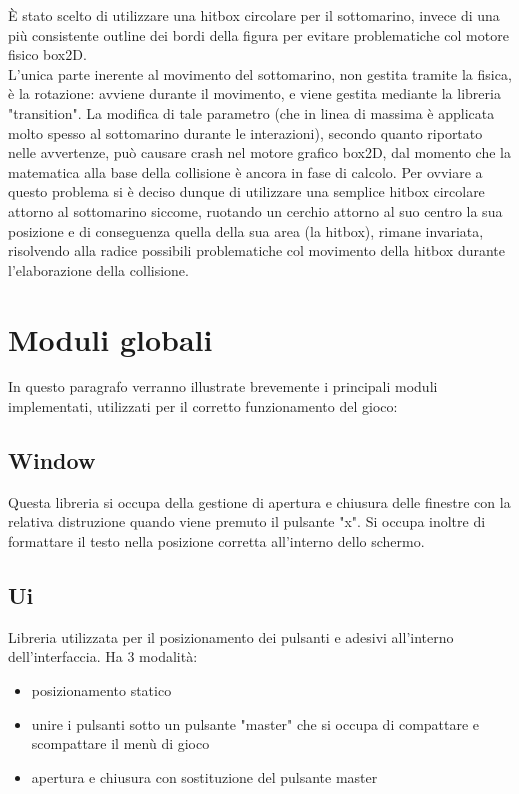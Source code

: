 \documentclass[15pt]{article}
\begin{document}
È stato scelto di utilizzare una hitbox circolare per il sottomarino, invece di una più consistente outline dei bordi della figura per evitare problematiche col motore fisico box2D.
\\
L’unica parte inerente al movimento del sottomarino, non gestita tramite la fisica, è la rotazione: avviene durante il movimento, e viene gestita mediante la libreria "transition". La modifica di tale parametro (che in linea di massima è applicata molto spesso al sottomarino durante le interazioni), secondo quanto riportato nelle avvertenze, può causare crash nel motore grafico box2D, dal momento che la matematica alla base della collisione è ancora in fase di calcolo. Per ovviare a questo problema si è deciso dunque di utilizzare una semplice hitbox circolare attorno al sottomarino siccome, ruotando un cerchio attorno al suo centro la sua posizione e di conseguenza quella della sua area (la hitbox), rimane invariata, risolvendo alla radice possibili problematiche col movimento della hitbox durante l’elaborazione della collisione.

\section{Moduli globali}
In questo paragrafo verranno illustrate brevemente i principali moduli implementati, utilizzati per il corretto funzionamento del gioco:
\\
\subsection{Window}
Questa libreria si occupa della gestione di apertura e chiusura delle finestre con la relativa distruzione quando viene premuto il pulsante "x". Si occupa inoltre di formattare il testo nella posizione corretta all'interno dello schermo.
\subsection{Ui}
Libreria utilizzata per il posizionamento dei pulsanti e adesivi all'interno dell'interfaccia. Ha 3 modalità:
            \begin{itemize}
                \item posizionamento statico 
                \item unire i pulsanti sotto un pulsante "master" che si occupa di compattare e scompattare il menù di gioco
                \item apertura e chiusura con sostituzione del pulsante master
            \end{itemize}
\end{document}
